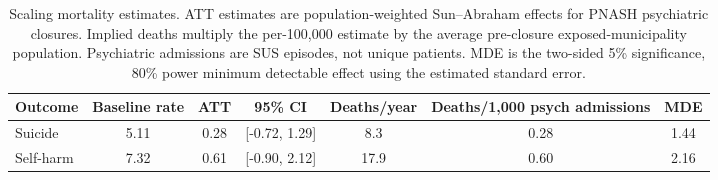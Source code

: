 \begin{table}[!htbp]\centering
\caption{Scaling mortality estimates. ATT estimates are population-weighted Sun--Abraham effects for PNASH psychiatric closures. Implied deaths multiply the per-100,000 estimate by the average pre-closure exposed-municipality population. Psychiatric admissions are SUS episodes, not unique patients. MDE is the two-sided 5\% significance, 80\% power minimum detectable effect using the estimated standard error.}
\label{tab:mortality-scaling-mde-revision}
\small
\begin{tabular}{lcccccc}
\toprule
Outcome & Baseline rate & ATT & 95\% CI & Deaths/year & Deaths/1,000 psych admissions & MDE \\
\midrule
Suicide & 5.11 & 0.28 & [-0.72, 1.29] & 8.3 & 0.28 & 1.44 \\
Self-harm & 7.32 & 0.61 & [-0.90, 2.12] & 17.9 & 0.60 & 2.16 \\
\bottomrule
\end{tabular}
\end{table}
